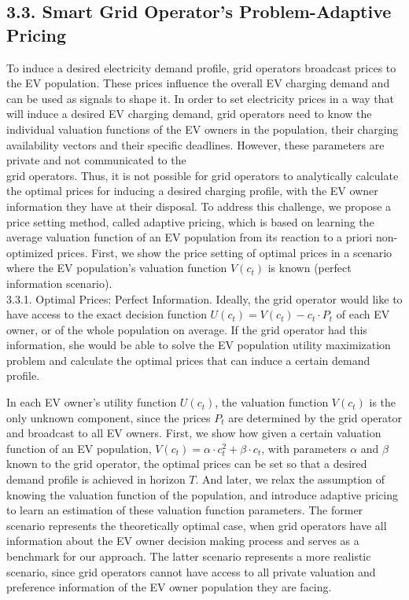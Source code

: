 \documentclass[10pt]{article}
\begin{document}
\subsection*{3.3. Smart Grid Operator's Problem-Adaptive Pricing}
To induce a desired electricity demand profile, grid operators broadcast prices to the EV population. These prices influence the overall EV charging demand and can be used as signals to shape it. In order to set electricity prices in a way that will induce a desired EV charging demand, grid operators need to know the individual valuation functions of the EV owners in the population, their charging availability vectors and their specific deadlines. However, these parameters are private and not communicated to the\\
grid operators. Thus, it is not possible for grid operators to analytically calculate the optimal prices for inducing a desired charging profile, with the EV owner information they have at their disposal. To address this challenge, we propose a price setting method, called adaptive pricing, which is based on learning the average valuation function of an EV population from its reaction to a priori non-optimized prices. First, we show the price setting of optimal prices in a scenario where the EV population's valuation function $V\left(c_{t}\right)$ is known (perfect information scenario).\\
3.3.1. Optimal Prices: Perfect Information. Ideally, the grid operator would like to have access to the exact decision function $U\left(c_{t}\right)=V\left(c_{t}\right)-c_{t} \cdot P_{t}$ of each EV owner, or of the whole population on average. If the grid operator had this information, she would be able to solve the EV population utility maximization problem and calculate the optimal prices that can induce a certain demand profile.

In each EV owner's utility function $U\left(c_{t}\right)$, the valuation function $V\left(c_{t}\right)$ is the only unknown component, since the prices $P_{t}$ are determined by the grid operator and broadcast to all EV owners. First, we show how given a certain valuation function of an EV population, $V\left(c_{t}\right)=\alpha \cdot c_{t}^{2}+\beta \cdot c_{t}$, with parameters $\alpha$ and $\beta$ known to the grid operator, the optimal prices can be set so that a desired demand profile is achieved in horizon $T$. And later, we relax the assumption of knowing the valuation function of the population, and introduce adaptive pricing to learn an estimation of these valuation function parameters. The former scenario represents the theoretically optimal case, when grid operators have all information about the EV owner decision making process and serves as a benchmark for our approach. The latter scenario represents a more realistic scenario, since grid operators cannot have access to all private valuation and preference information of the EV owner population they are facing.
\end{document}
